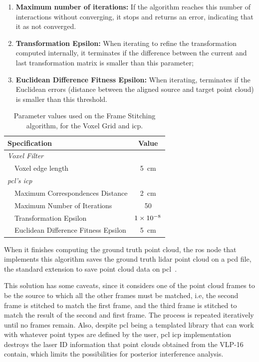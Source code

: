 \begin{enumerate}
\item \textbf{Maximum number of iterations:} If the algorithm reaches this number of interactions without converging, it stops and returns an error, indicating that it as not converged.
\item \textbf{Transformation Epsilon:} When iterating to refine the transformation computed internally, it terminates if the difference between the current and last transformation matrix is smaller than this parameter;
\item \textbf{Euclidean Difference Fitness Epsilon:} When iterating, terminates if the Euclidean errors (distance between the aligned source and target point cloud) is smaller than this threshold.
\end{enumerate}


\begin{table}[!ht]
\centering
\renewcommand{\arraystretch}{1.2}
\begin{tabular}{@{}lp{8cm}c@{}}
	\toprule
	\multicolumn{2}{l}{Specification} & Value \\
		\midrule
	\multicolumn{2}{l}{\textit{Voxel Filter}} & \\ 
	\phantom{ab} & Voxel edge length & \SI{5}{\centi\meter} \\ 
	\midrule
	\multicolumn{2}{l}{\textit{\ac{pcl}'s \ac{icp}}} &  \\ 
	\phantom{ab} & Maximum Correspondences Distance & \SI{2}{\centi\meter} \\
							 & Maximum Number of Iterations & 50 \\
							 & Transformation Epsilon & $1\times 10^{-8}$ \\
							 & Euclidean Difference Fitness Epsilon & \SI{5}{\centi\meter} \\
	\bottomrule
\end{tabular}
\caption[Parameters used on the Frame Stitching algorithm, for the ground-truth model generation.]{Parameter values used on the Frame Stitching algorithm, for the Voxel Grid and \ac{icp}.}
\label{tab:frame-stitching-parameters}
\end{table}

When it finishes computing the ground truth point cloud, the \ac{ros} node that implements this algorithm saves the ground truth \ac{lidar} point cloud on a \ac{pcd} file, the standard extension to save point cloud data on \ac{pcl}~\cite{PCL}.

This solution has some caveats, since it considers one of the point cloud frames to be the source to which all the other frames must be matched, i.e, the second frame is stitched to match the first frame, and the third frame is stitched to match the result of the second and first frame. The process is repeated iteratively until no frames remain. Also, despite \ac{pcl} being a templated library that can work with whatever point types are defined by the user, \ac{pcl} \ac{icp} implementation destroys the laser ID information that point clouds obtained from the VLP-16 contain, which limits the possibilities for posterior interference analysis. 


